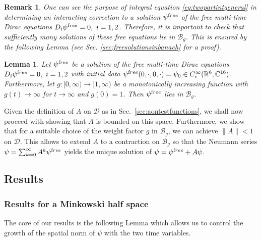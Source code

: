 \documentclass[b5paper,draft,openbib,12pt]{memoir}
\newtheorem{Lemma}[Def]{Lemma}
\newtheorem{Remark}[Def]{Remark}
\newcommand{\R}{\mathbb{R}}
\newcommand{\CC}{\mathbb{C}}
\newcommand{\free}{{\textup free}}
\newcommand{\Banach}{\mathscr{B}}
\begin{document}
\begin{Remark} 
  One can see the purpose of integral equation \eqref{eq:twopartintgeneral} in 
  determining an interacting correction to a solution $\psi^\free$ 
  of the free multi-time Dirac equations $D_i \psi^\free = 0,~i=1,2$. 
  Therefore, it is important to check that sufficiently many 
  solutions of these free equations lie in $\Banach_g$. This is 
  ensured by the following Lemma (see Sec. 
  \ref{sec:freesolutionsinbanach} for a proof).

\end{Remark}

\begin{Lemma}
  Let $\psi^\free$ be a solution of the free multi-time Dirac 
  equations $D_i \psi^\free = 0,~i=1,2$ with initial data 
  $\psi^\free(0,\cdot,0,\cdot) = \psi_0 \in C_c^\infty(\R^6,\CC^{16})$. 
  Furthermore, let $g : [0,\infty) \rightarrow [1,\infty)$ be a 
  monotonically increasing function with $g(t) \rightarrow \infty$ 
  for $t \rightarrow \infty$ and \(g(0)=1\). Then $\psi^\free$ lies 
  in $\Banach_g$.
	\label{thm:freesolutionsinbanach}
\end{Lemma}

Given the definition of $A$ on $\mathscr{D}$ as in Sec.\ 
\ref{sec:aontestfunctions}, we shall now proceed with showing that 
$A$ is bounded on this space. Furthermore, we show that for a 
suitable choice of the weight factor $g$ in $\Banach_g$, we can 
achieve $\| A\| < 1$ on $\mathscr{D}$. This allows to extend $A$ to 
a contraction on $\Banach_g$ so that the Neumann series 
$\psi = \sum_{k=0}^\infty A^k \psi^\free$ yields the unique 
solution of $\psi = \psi^\free + A\psi$.

\subsection{Results} \label{sec:results}

\subsubsection{Results for a Minkowski half space} \label{sec:minkhalfspace}

The core of our results is the following Lemma which allows us to control the growth of the spatial norm of $\psi$ with the two time variables.
\end{document}
